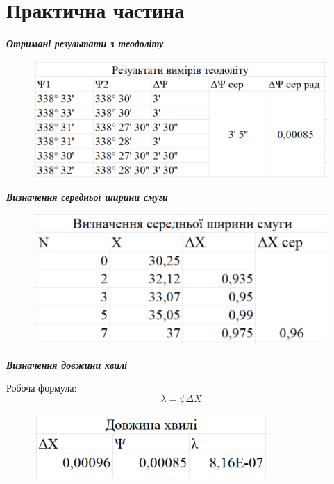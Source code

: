 \section{Практична частина}
\setlength{\parindent}{4em}

\begin{center}
  {\textbf{\emph{Отримані результати з теодоліту}}}
\end{center}
\begin{figure}[ht]

\centering

\includegraphics[width=0.55\linewidth]{Pics/Teo.png}


\label{Teo}

\end{figure}
\begin{center}
  {\textbf{\emph{Визначення середньої ширини смуги}}}
\end{center}
\begin{figure}[ht]

\centering

\includegraphics[width=0.55\linewidth]{Pics/width.png}


\label{width}

\end{figure}
\begin{center}
  {\textbf{\emph{Визначення довжини хвилі}}}
\end{center}
\indent Робоча формула:
$$\lambda = \psi \Delta X$$
\begin{figure}[ht]

\centering

\includegraphics[width=0.4\linewidth]{Pics/lenght.png}


\label{lenght}

\end{figure}

